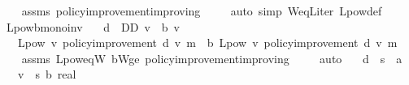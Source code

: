 \begin{isabellebody}
%
\isadelimproof
\ \ %
\endisadelimproof
%
\isatagproof
{}\isamarkupfalse%
\ assms\ policy{\isacharunderscore}{\kern0pt}improvement{\isacharunderscore}{\kern0pt}improving\ \isanewline
\ \ \isamarkupfalse%
\ {\isacharparenleft}{\kern0pt}auto\ simp{\isacharcolon}{\kern0pt}\ W{\isacharunderscore}{\kern0pt}eq{\isacharunderscore}{\kern0pt}L{\isacharunderscore}{\kern0pt}iter\ L{\isacharunderscore}{\kern0pt}pow{\isacharunderscore}{\kern0pt}def{\isacharparenright}{\kern0pt}%
\endisatagproof
{\isafoldproof}%
%
\isadelimproof
\isanewline
%
\endisadelimproof
\isanewline
{}\isamarkupfalse%
\ L{\isacharunderscore}{\kern0pt}pow{\isacharunderscore}{\kern0pt}{\isasymL}\isactrlsub b{\isacharunderscore}{\kern0pt}mono{\isacharunderscore}{\kern0pt}inv{\isacharcolon}{\kern0pt}\isanewline
\ \ \ {\isachardoublequoteopen}d\ {\isasymin}\ D\isactrlsub D{\isachardoublequoteclose}\ {\isachardoublequoteopen}v\ {\isasymle}\ {\isasymL}\isactrlsub b\ v{\isachardoublequoteclose}\isanewline
\ \ \ {\isachardoublequoteopen}L{\isacharunderscore}{\kern0pt}pow\ v\ {\isacharparenleft}{\kern0pt}policy{\isacharunderscore}{\kern0pt}improvement\ d\ v{\isacharparenright}{\kern0pt}\ m\ {\isasymle}\ {\isasymL}\isactrlsub b\ {\isacharparenleft}{\kern0pt}L{\isacharunderscore}{\kern0pt}pow\ v\ {\isacharparenleft}{\kern0pt}policy{\isacharunderscore}{\kern0pt}improvement\ d\ v{\isacharparenright}{\kern0pt}\ m{\isacharparenright}{\kern0pt}{\isachardoublequoteclose}\isanewline
%
\isadelimproof
\ \ %
\endisadelimproof
%
\isatagproof
{}\isamarkupfalse%
\ assms\ L{\isacharunderscore}{\kern0pt}pow{\isacharunderscore}{\kern0pt}eq{\isacharunderscore}{\kern0pt}W\ {\isasymL}\isactrlsub b{\isacharunderscore}{\kern0pt}W{\isacharunderscore}{\kern0pt}ge\ policy{\isacharunderscore}{\kern0pt}improvement{\isacharunderscore}{\kern0pt}improving\ \isanewline
\ \ \isamarkupfalse%
\ auto%
\endisatagproof
{\isafoldproof}%
%
\isadelimproof
%
\endisadelimproof
%
\isadelimdocument
%
\endisadelimdocument
%
\isatagdocument
%
\isamarkuptrue%
%
\endisatagdocument
{\isafolddocument}%
%
\isadelimdocument
%
\endisadelimdocument
{}\isamarkupfalse%
\isanewline
\ \ \ d{}\ {\isacharcolon}{\kern0pt}{\isacharcolon}{\kern0pt}\ {\isachardoublequoteopen}{\isacharprime}{\kern0pt}s\ {\isasymRightarrow}\ {\isacharprime}{\kern0pt}a{\isachardoublequoteclose}\isanewline
\ \ \ v{}\ {\isacharcolon}{\kern0pt}{\isacharcolon}{\kern0pt}\ {\isachardoublequoteopen}{\isacharprime}{\kern0pt}s\ {\isasymRightarrow}\isactrlsub b\ real{\isachardoublequoteclose}\isanewline

\end{isabellebody}

